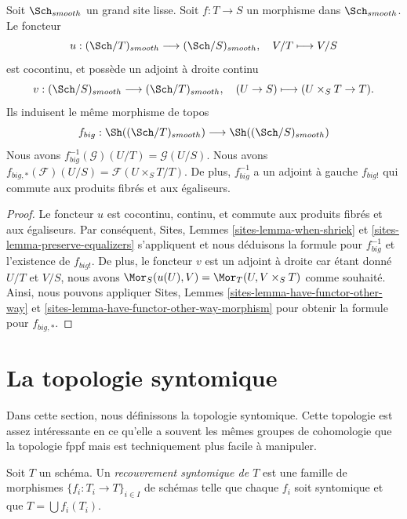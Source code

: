 \begin{lemma}
\label{lemma-morphism-big-smooth}
Soit $\Sch_{smooth}$ un grand site lisse. Soit $f : T \to S$ un morphisme dans $\Sch_{smooth}$. Le foncteur
$$
u : (\Sch/T)_{smooth} \longrightarrow (\Sch/S)_{smooth},
\quad
V/T \longmapsto V/S
$$
est cocontinu, et possède un adjoint à droite continu
$$
v : (\Sch/S)_{smooth} \longrightarrow (\Sch/T)_{smooth},
\quad
(U \to S) \longmapsto (U \times_S T \to T).
$$
Ils induisent le même morphisme de topos
$$
f_{big} :
\Sh((\Sch/T)_{smooth})
\longrightarrow
\Sh((\Sch/S)_{smooth})
$$
Nous avons $f_{big}^{-1}(\mathcal{G})(U/T) = \mathcal{G}(U/S)$. Nous avons $f_{big, *}(\mathcal{F})(U/S) = \mathcal{F}(U \times_S T/T)$. De plus, $f_{big}^{-1}$ a un adjoint à gauche $f_{big!}$ qui commute aux produits fibrés et aux égaliseurs.
\end{lemma}

\begin{proof}
Le foncteur $u$ est cocontinu, continu, et commute aux produits fibrés et aux égaliseurs. Par conséquent, Sites, Lemmes \ref{sites-lemma-when-shriek} et \ref{sites-lemma-preserve-equalizers} s'appliquent et nous déduisons la formule pour $f_{big}^{-1}$ et l'existence de $f_{big!}$. De plus, le foncteur $v$ est un adjoint à droite car étant donné $U/T$ et $V/S$, nous avons $\Mor_S(u(U), V) = \Mor_T(U, V \times_S T)$ comme souhaité. Ainsi, nous pouvons appliquer Sites, Lemmes \ref{sites-lemma-have-functor-other-way} et \ref{sites-lemma-have-functor-other-way-morphism} pour obtenir la formule pour $f_{big, *}$.
\end{proof}











\section{La topologie syntomique}
\label{section-syntomic}

\noindent
Dans cette section, nous définissons la topologie syntomique. Cette topologie est assez intéressante en ce qu'elle a souvent les mêmes groupes de cohomologie que la topologie fppf mais est techniquement plus facile à manipuler.

\begin{definition}
\label{definition-syntomic-covering}
Soit $T$ un schéma. Un {\it recouvrement syntomique de $T$} est une famille de morphismes $\{f_i : T_i \to T\}_{i \in I}$ de schémas telle que chaque $f_i$ soit syntomique et que $T = \bigcup f_i(T_i)$.
\end{definition}

